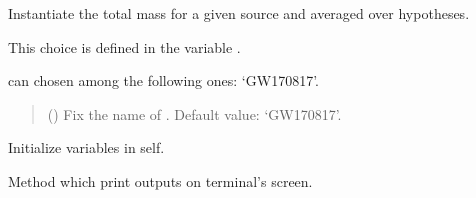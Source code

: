 \documentclass[letterpaper,10pt,english]{sphinxmanual}
\begin{document}
\begin{fulllineitems}
\label{\detokenize{source/api/setup_astro_gw:nucleardatapy.astro.setup_gw.setupGWAverage}}
\pysigstartsignatures
{}
\pysigstopsignatures
\sphinxAtStartPar
Instantiate the total mass for a given source and averaged over hypotheses.

\sphinxAtStartPar
This choice is defined in the variable .

\sphinxAtStartPar
{} can chosen among the following ones: ‘GW170817’.
\begin{quote}\begin{description}
\sphinxAtStartPar
{} (\sphinxstyleliteralemphasis{\sphinxupquote{, }}) \textendash{} Fix the name of . Default value: ‘GW170817’.

\end{description}\end{quote}

\sphinxAtStartPar
{}

\begin{fulllineitems}
\label{\detokenize{source/api/setup_astro_gw:nucleardatapy.astro.setup_gw.setupGWAverage.init_self}}
\pysigstartsignatures
{}
\pysigstopsignatures
\sphinxAtStartPar
Initialize variables in self.

\end{fulllineitems}


\begin{fulllineitems}
\label{\detokenize{source/api/setup_astro_gw:nucleardatapy.astro.setup_gw.setupGWAverage.print_output}}
\pysigstartsignatures
{}
\pysigstopsignatures
\sphinxAtStartPar
Method which print outputs on terminal’s screen.


\end{fulllineitems}
\end{fulllineitems}
\end{document}
